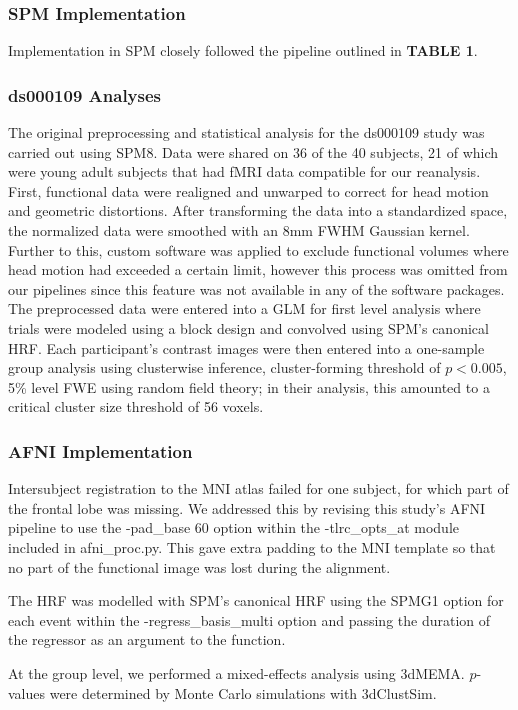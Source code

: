 \subsubsection{SPM Implementation}
Implementation in SPM closely followed the pipeline outlined in \textbf{TABLE 1}.

\subsubsection{ds000109 Analyses}
The original preprocessing and statistical analysis for the ds000109 study was carried out using SPM8. Data were shared on 36 of the 40 subjects, 21 of which were young adult subjects that had fMRI data compatible for our reanalysis. First, functional data were realigned and unwarped to correct for head motion and geometric distortions. After transforming the data into a standardized space, the normalized data were smoothed with an 8mm FWHM Gaussian kernel. Further to this, custom software was applied to exclude functional volumes where head motion had exceeded a certain limit, however this process was omitted from our pipelines since this feature was not available in any of the software packages. The preprocessed data were entered into a GLM for first level analysis where trials were modeled using a block design and convolved using SPM's canonical HRF. Each participant's contrast images were then entered into a one-sample group analysis using clusterwise inference, cluster-forming threshold of $p < 0.005$, 5\% level FWE using random field theory; in their analysis, this amounted to a critical cluster size threshold of 56 voxels. 

\subsubsection{AFNI Implementation}
Intersubject registration to the MNI atlas failed for one subject, for which part of the frontal lobe was missing. We addressed this by revising this study's AFNI pipeline to use the -pad\_base 60 option within the -tlrc\_opts\_at module included in afni\_proc.py. This gave extra padding to the MNI template so that no part of the functional image was lost during the alignment. 

The HRF was modelled with SPM's canonical HRF using the SPMG1 option for each event within the -regress\_basis\_multi option and passing the duration of the regressor as an argument to the function.

At the group level, we performed a mixed-effects analysis using 3dMEMA. $p$-values were determined by Monte Carlo simulations with 3dClustSim.

